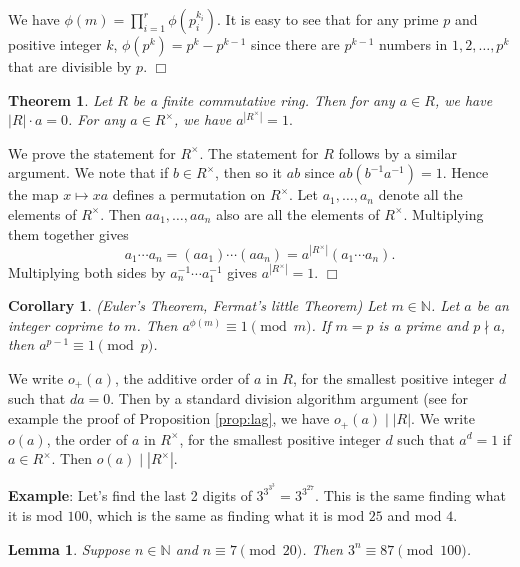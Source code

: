 \documentclass{article}
\def\N{{\mathbb N}}
\newtheorem{theorem}[subsection]{Theorem}
\newtheorem{cor}[subsection]{Corollary}
\newtheorem{lemma}[subsection]{Lemma}
\newenvironment{proof}{\noindent {\bf Proof:}}{$\Box$ \vspace{2 ex}}
\begin{document}
\begin{proof}
    We have $\phi(m) = \prod_{i=1}^r \phi(p_i^{k_i}).$ It is easy to see that for any prime $p$ and positive integer $k$, $\phi(p^k) = p^k - p^{k-1}$ since there are $p^{k-1}$ numbers in $1,2,\ldots,p^k$ that are divisible by $p$.
\end{proof}

\begin{theorem}
    Let $R$ be a finite commutative ring. Then for any $a\in R$, we have $|R|\cdot a = 0$. For any $a\in R^\times$, we have $a^{|R^\times|} = 1.$
\end{theorem}

\begin{proof}
    We prove the statement for $R^\times$. The statement for $R$ follows by a similar argument. We note that if $b\in R^\times$, then so it $ab$ since $ab(b^{-1}a^{-1}) = 1$. Hence the map $x\mapsto xa$ defines a permutation on $R^\times$. Let $a_1,\ldots,a_n$ denote all the elements of $R^\times$. Then $aa_1,\ldots,aa_n$ also are all the elements of $R^\times$. Multiplying them together gives
    $$a_1\cdots a_n = (aa_1)\cdots(aa_n) = a^{|R^\times|}(a_1\cdots a_n).$$
    Multiplying both sides by $a_n^{-1}\cdots a_1^{-1}$ gives $a^{|R^\times|} = 1.$
\end{proof}

\begin{cor}
    (Euler's Theorem, Fermat's little Theorem) Let $m\in\N$. Let $a$ be an integer coprime to $m$. Then $a^{\phi(m)}\equiv 1\pmod{m}$. If $m = p$ is a prime and $p\nmid a$, then $a^{p-1}\equiv 1\pmod{p}$.
\end{cor}

We write $o_+(a)$, the additive order of $a$ in $R$, for the smallest positive integer $d$ such that $da = 0$. Then by a standard division algorithm argument (see for example the proof of Proposition \ref{prop:lag}, we have $o_+(a)\mid |R|$. We write $o(a)$, the order of $a$ in $R^\times$, for the smallest positive integer $d$ such that $a^d = 1$ if $a\in R^\times$. Then $o(a)\mid |R^\times|$.


\vspace{3pt}
\noindent\textbf{Example}: Let's find the last 2 digits of $3^{3^{3^3}} = 3^{3^{27}}$. This is the same finding what it is mod $100$, which is the same as finding what it is mod $25$ and mod $4$.

\begin{lemma}
    Suppose $n\in\N$ and $n\equiv 7\pmod{20}$. Then $3^n\equiv 87\pmod{100}$.
\end{lemma}
\end{document}
